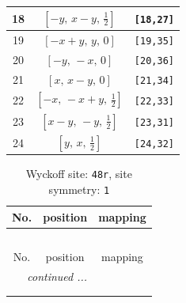 \documentclass[fleqn,8pt]{jsarticle}
\begin{document}
\begin{longtable}{ccc}
18 & $\left[ - y,\, x - y,\, \frac{1}{2} \right]$ & {\tt [18,27]} \\ \hline
19 & $\left[ - x + y,\, y,\, 0 \right]$ & {\tt [19,35]} \\ \hline
20 & $\left[ - y,\, - x,\, 0 \right]$ & {\tt [20,36]} \\ \hline
21 & $\left[ x,\, x - y,\, 0 \right]$ & {\tt [21,34]} \\ \hline
22 & $\left[ - x,\, - x + y,\, \frac{1}{2} \right]$ & {\tt [22,33]} \\ \hline
23 & $\left[ x - y,\, - y,\, \frac{1}{2} \right]$ & {\tt [23,31]} \\ \hline
24 & $\left[ y,\, x,\, \frac{1}{2} \right]$ & {\tt [24,32]} \\
\end{longtable}
\renewcommand{\arraystretch}{1.2}
\begin{longtable}{ccc}
\caption{Wyckoff site: {\tt 48r}, site symmetry: {\tt 1}}
 \\
 \hline \hline
No. & position & mapping \\ \hline \endfirsthead

\multicolumn{2}{l}{\tablename\ \thetable{}} \\
 \hline \hline
No. & position & mapping \\ \hline \endhead

 \hline \hline
\multicolumn{2}{r}{\footnotesize\it continued ...} \\ \endfoot

 \hline \hline
\multicolumn{2}{r}{} \\ \endlastfoot


\end{longtable}
\end{document}
